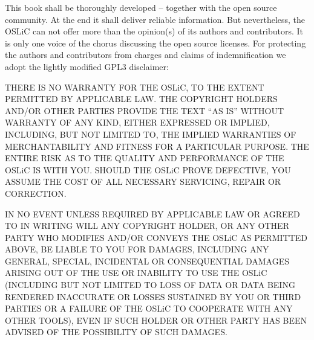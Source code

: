 %
%
%
%

%


This book shall be thoroughly developed -- together with the open source
community. At the end it shall deliver reliable information. But nevertheless,
the OSLiC can not offer more than the opinion(s) of its authors and
contributors. It is only one voice of the chorus discussing the open source
licenses. For protecting the authors and contributors from charges and claims of
indemnification we adopt the lightly modified GPL3 disclaimer:

THERE IS NO WARRANTY FOR THE OSLiC, TO THE EXTENT PERMITTED BY APPLICABLE LAW.
THE COPYRIGHT HOLDERS AND/OR OTHER PARTIES PROVIDE THE TEXT “AS IS” WITHOUT
WARRANTY OF ANY KIND, EITHER EXPRESSED OR IMPLIED, INCLUDING, BUT NOT LIMITED
TO, THE IMPLIED WARRANTIES OF MERCHANTABILITY AND FITNESS FOR A PARTICULAR
PURPOSE. THE ENTIRE RISK AS TO THE QUALITY AND PERFORMANCE OF THE OSLiC IS
WITH YOU. SHOULD THE OSLiC PROVE DEFECTIVE, YOU ASSUME THE COST OF ALL
NECESSARY SERVICING, REPAIR OR CORRECTION.

IN NO EVENT UNLESS REQUIRED BY APPLICABLE LAW OR AGREED TO IN WRITING WILL ANY
COPYRIGHT HOLDER, OR ANY OTHER PARTY WHO MODIFIES AND/OR CONVEYS THE OSLiC AS
PERMITTED ABOVE, BE LIABLE TO YOU FOR DAMAGES, INCLUDING ANY GENERAL, SPECIAL,
INCIDENTAL OR CONSEQUENTIAL DAMAGES ARISING OUT OF THE USE OR INABILITY TO USE
THE OSLiC (INCLUDING BUT NOT LIMITED TO LOSS OF DATA OR DATA BEING RENDERED
INACCURATE OR LOSSES SUSTAINED BY YOU OR THIRD PARTIES OR A FAILURE OF THE
OSLiC TO COOPERATE WITH ANY OTHER TOOLS), EVEN IF SUCH HOLDER OR OTHER PARTY
HAS BEEN ADVISED OF THE POSSIBILITY OF SUCH DAMAGES.

